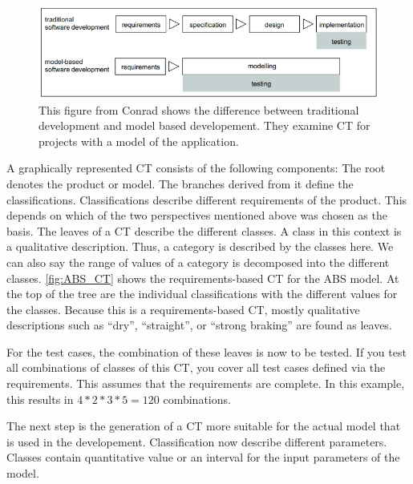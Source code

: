 \begin{figure}[H]
\centering
\includegraphics[scale=0.75]{../../individual/groeger/images/TraditionalVSModel.png} 
\caption{This figure from Conrad\cite{Conrad} shows the difference between traditional development and model based developement. They examine CT for projects with a model of the application. \cite{Conrad}}
\label{fig:tradditional_vs_modelbased}
\end{figure}

A graphically represented CT consists of the following components: The root denotes the product or model. The branches derived from it define the classifications. Classifications describe different requirements of the product. This depends on which of the two perspectives mentioned above was chosen as the basis. The leaves of a CT describe the different classes. A class in this context is a qualitative description. Thus, a category is described by the classes here. We can also say the range of values of a category is decomposed into the different classes. \autoref{fig:ABS_CT} shows the requirements-based CT for the ABS model. At the top of the tree are the individual classifications with the different values for the classes. Because this is a requirements-based CT, mostly qualitative descriptions such as \enquote{dry}, \enquote{straight}, or \enquote{strong braking} are found as leaves.  

For the test cases, the combination of these leaves is now to be tested. If you test all combinations of classes of this CT, you cover all test cases defined via the requirements. This assumes that the requirements are complete. In this example, this results in $4*2*3*5 = 120$ combinations.

The next step is the generation of a CT more suitable for the actual model that is used in the developement. Classification now describe different parameters. Classes contain quantitative value or an interval for the input parameters of the model. 

